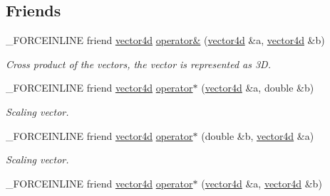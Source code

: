 \subsection*{Friends}
\begin{DoxyCompactItemize}
\item 
\hypertarget{classbt_1_1vector4d_a3c868fb9085e095e54bfa06908c3c782}{\-\_\-\-F\-O\-R\-C\-E\-I\-N\-L\-I\-N\-E friend \hyperlink{classbt_1_1vector4d}{vector4d} \hyperlink{classbt_1_1vector4d_a3c868fb9085e095e54bfa06908c3c782}{operator\&} (\hyperlink{classbt_1_1vector4d}{vector4d} \&a, \hyperlink{classbt_1_1vector4d}{vector4d} \&b)}\label{classbt_1_1vector4d_a3c868fb9085e095e54bfa06908c3c782}

\begin{DoxyCompactList}\small\item\em Cross product of the vectors, the vector is represented as 3\-D. \end{DoxyCompactList}\item 
\hypertarget{classbt_1_1vector4d_a1cebe35f2d85171282fb05ff3a188a50}{\-\_\-\-F\-O\-R\-C\-E\-I\-N\-L\-I\-N\-E friend \hyperlink{classbt_1_1vector4d}{vector4d} \hyperlink{classbt_1_1vector4d_a1cebe35f2d85171282fb05ff3a188a50}{operator$\ast$} (\hyperlink{classbt_1_1vector4d}{vector4d} \&a, double \&b)}\label{classbt_1_1vector4d_a1cebe35f2d85171282fb05ff3a188a50}

\begin{DoxyCompactList}\small\item\em Scaling vector. \end{DoxyCompactList}\item 
\hypertarget{classbt_1_1vector4d_add7f9d9634ba9e6fb0adb84125a12b82}{\-\_\-\-F\-O\-R\-C\-E\-I\-N\-L\-I\-N\-E friend \hyperlink{classbt_1_1vector4d}{vector4d} \hyperlink{classbt_1_1vector4d_add7f9d9634ba9e6fb0adb84125a12b82}{operator$\ast$} (double \&b, \hyperlink{classbt_1_1vector4d}{vector4d} \&a)}\label{classbt_1_1vector4d_add7f9d9634ba9e6fb0adb84125a12b82}

\begin{DoxyCompactList}\small\item\em Scaling vector. \end{DoxyCompactList}\item 
\hypertarget{classbt_1_1vector4d_a0dc22b59c9654cf8253f81904f1a4468}{\-\_\-\-F\-O\-R\-C\-E\-I\-N\-L\-I\-N\-E friend \hyperlink{classbt_1_1vector4d}{vector4d} \hyperlink{classbt_1_1vector4d_a0dc22b59c9654cf8253f81904f1a4468}{operator$\ast$} (\hyperlink{classbt_1_1vector4d}{vector4d} \&a, \hyperlink{classbt_1_1vector4d}{vector4d} \&b)}\label{classbt_1_1vector4d_a0dc22b59c9654cf8253f81904f1a4468}


\end{DoxyCompactItemize}
